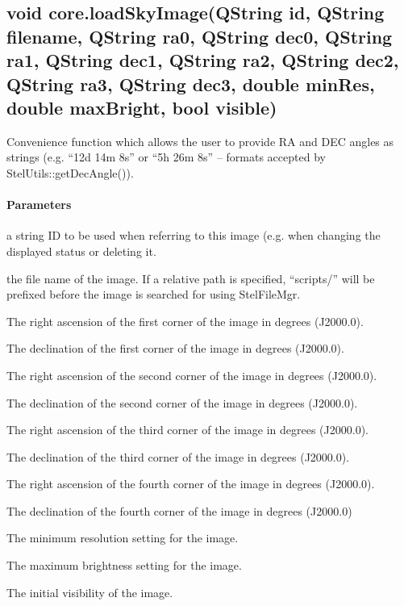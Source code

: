 \subsection{void core.loadSkyImage(QString id, QString filename, QString ra0, QString dec0, QString ra1, QString dec1, QString ra2, QString dec2, QString ra3, QString dec3, double minRes, double maxBright, bool visible)}
\label{sec:ScriptingAPI:core:loadSkyImageStr}
Convenience function which allows the user to provide RA and DEC angles as strings (e.g. ``12d 14m 8s'' or ``5h 26m 8s'' -- formats accepted by StelUtils::getDecAngle()).

\paragraph{Parameters}
\begin{description}[align=right,labelwidth=3cm,leftmargin=3.2cm]
\item[\parameter{id}] a string ID to be used when referring to this image (e.g. when changing the displayed status or deleting it.
\item[\parameter{filename}] the file name of the image. If a relative path is specified, ``scripts/'' will be prefixed before the image is searched for using StelFileMgr.
\item[\parameter{ra0}] The right ascension of the first corner of the image in degrees (J2000.0).
\item[\parameter{dec0}] The declination of the first corner of the image in degrees (J2000.0).
\item[\parameter{ra1}] The right ascension of the second corner of the image in degrees (J2000.0).
\item[\parameter{dec1}] 	The declination of the second corner of the image in degrees (J2000.0).
\item[\parameter{ra2}] The right ascension of the third corner of the image in degrees (J2000.0).
\item[\parameter{dec2}] The declination of the third corner of the image in degrees (J2000.0).
\item[\parameter{ra3}] The right ascension of the fourth corner of the image in degrees (J2000.0).
\item[\parameter{dec3}] The declination of the fourth corner of the image in degrees (J2000.0)
\item[\parameter{minRes}] The minimum resolution setting for the image.
\item[\parameter{maxBright}] The maximum brightness setting for the image.
\item[\parameter{visible}] The initial visibility of the image.
\end{description}


